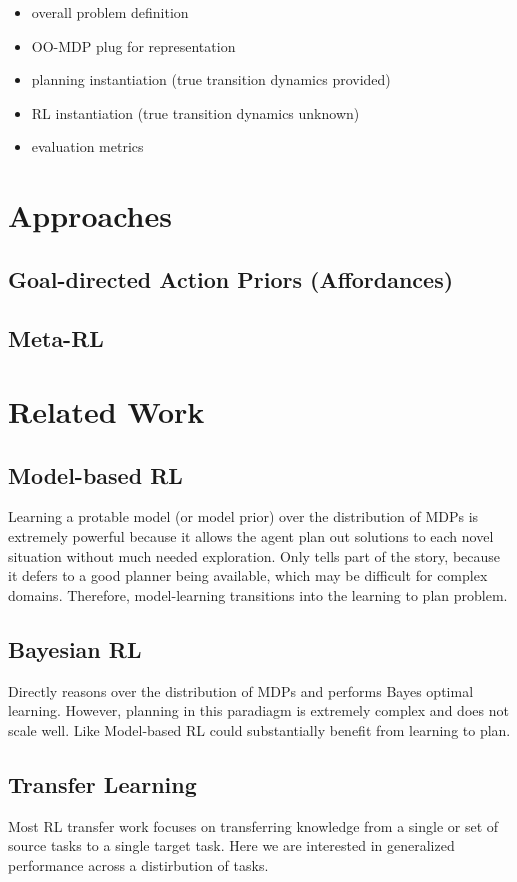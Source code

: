 \begin{itemize}
\item overall problem definition
\item OO-MDP plug for representation
\item planning instantiation (true transition dynamics provided)
\item RL instantiation (true transition dynamics unknown)
\item evaluation metrics 
\end{itemize}

\section{Approaches}
\subsection{Goal-directed Action Priors (Affordances)}
\subsection{Meta-RL}

\section{Related Work}
\subsection{Model-based RL}
Learning a protable model (or model prior) over the distribution of MDPs is extremely powerful because it allows the agent plan out solutions to each novel situation without much needed exploration. Only tells part of the story, because it defers to a good planner being available, which may be difficult for complex domains. Therefore, model-learning transitions into the learning to plan problem.
\subsection{Bayesian RL}
Directly reasons over the distribution of MDPs and performs Bayes optimal learning. However, planning in this paradiagm is extremely complex and does not scale well. Like Model-based RL could substantially benefit from learning to plan.
\subsection{Transfer Learning}
Most RL transfer work focuses on transferring knowledge from a single or set of source tasks to a single target task. Here we are interested in generalized performance across a distirbution of tasks.
